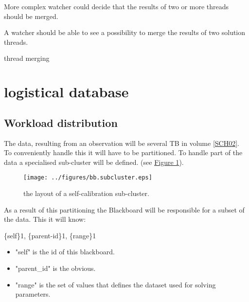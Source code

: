 \documentclass[]{lofar}
\begin{document}
          More complex watcher could decide that the results of two or
          more threads should be merged.

          \begin{requirement}
            A watcher should be able to see a possibility to merge the
            results of two solution threads.
            \caption{thread merging\label{req:merge}}
          \end{requirement}

  \section{logistical database}
  \label{sec:logistical-datamodel}
  \hypertarget{sec:logistical-datamodel}{}

    \subsection{Workload distribution}
    \label{subsec:workload-distribution-2}\hypertarget{subsec:workload-distribution-2}{}

      The data, resulting from an observation will be several TB in
      volume
      \hyperlink{bib:LOFAR-ASTRON-MEM-035}{[SCH02]}. To
      conveniently handle this it will have to be partitioned. To
      handle part of the data a specialised sub-cluster will be
      defined. (see \hyperlink{fig:bb.subcluster}{Figure 1}).

      \begin{figure}
        \texttt{[image: ../figures/bb.subcluster.eps]}
        \hypertarget{fig:bb.subcluster}{}
        \caption{the layout of a self-calibration sub-cluster.\label{fig:bb.subcluster}}
      \end{figure}

      As a result of this partitioning the Blackboard will be
      responsible for a subset of the data. This it will know:

      \{self\}1, \{parent-id\}1, \{range\}1

      \begin{itemize}

        \item 

          "self" is the id of this blackboard.

        \item 

          "parent\_id" is the obvious.

        \item 

          "range" is the set of values that defines the dataset used
          for solving parameters.

      \end{itemize}
\end{document}
